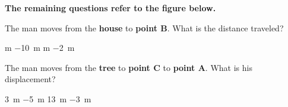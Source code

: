 \documentclass[addpoints]{exam}
\begin{document}
\begin{questions}
\clearpage
\begin{EnvUplevel}
\textbf{The remaining questions refer to the figure below.}
\end{EnvUplevel}



\question
The man moves from the \textbf{house} to \textbf{point B}. What is the distance traveled?

\begin{choices}
 m
\choice \SI{-10}{m}
 m
\choice \SI{-2}{m}
\end{choices}

\question
The man moves from the \textbf{tree} to \textbf{point C} to \textbf{point A}. What is his displacement?

\begin{choices}
\CorrectChoice \SI{3}{m}
\choice \SI{-5}{m}
\choice \SI{13}{m}
\choice \SI{-3}{m}
\end{choices}


\end{questions}
\end{document}

